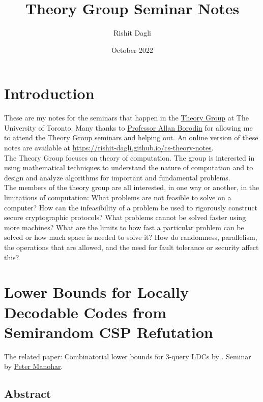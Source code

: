 \documentclass{article}
\title{Theory Group Seminar Notes}
\author{Rishit Dagli}
\date{October 2022}
\begin{document}
\maketitle

\tableofcontents
\clearpage

\section*{Introduction}

These are my notes for the seminars that happen in the \href{https://www.cs.toronto.edu/theory/}{Theory Group} at The University of Toronto. Many thanks to \href{http://www.cs.toronto.edu/~bor/}{Professor Allan Borodin} for allowing me to attend the Theory Group seminars and helping out. An online version of these notes are available at \url{https://rishit-dagli.github.io/cs-theory-notes}.\\

The Theory Group focuses on theory of computation. The group is interested in using mathematical techniques to understand the nature of computation and to design and analyze algorithms for important and fundamental problems.\\

The members of the theory group are all interested, in one way or another, in the limitations of computation: What problems are not feasible to solve on a computer? How can the infeasibility of a problem be used to rigorously construct secure cryptographic protocols? What problems cannot be solved faster using more machines? What are the limits to how fast a particular problem can be solved or how much space is needed to solve it? How do randomness, parallelism, the operations that are allowed, and the need for fault tolerance or security affect this?

\newpage

\section{Lower Bounds for Locally Decodable Codes from Semirandom CSP Refutation}

The related paper: Combinatorial lower bounds for 3-query LDCs by \citet{https://doi.org/10.48550/arxiv.1911.10698}. Seminar by \href{https://www.cs.cmu.edu/~pmanohar/}{Peter Manohar}.

\subsection{Abstract}
\end{document}
